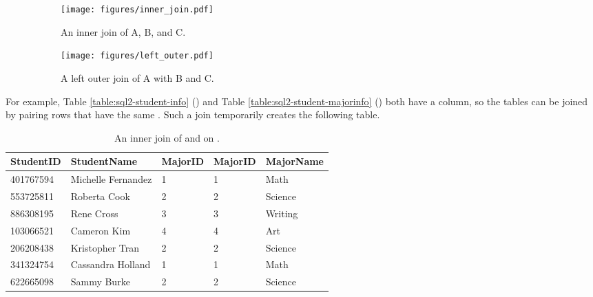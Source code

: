 \begin{figure}[H] %
\captionsetup[subfigure]{justification=centering}
\centering
\begin{subfigure}{.4\textwidth}
    \centering
    \texttt{[image: figures/inner\_join.pdf]}
    \caption{An inner join of A, B, and C.}
    \label{fig:sql2-inner-join}
\end{subfigure}
\hfil
\begin{subfigure}{.4\textwidth}
    \centering
    \texttt{[image: figures/left\_outer.pdf]}
    \caption{A left outer join of A with B and C.}
    \label{fig:sql2-left-join}
\end{subfigure}
%
\caption{}
\label{fig:joins}
\end{figure}

For example, Table \ref{table:sql2-student-info} () and Table \ref{table:sql2-student-majorinfo} () both have a  column, so the tables can be joined by pairing rows that have the same .
Such a join temporarily creates the following table.

\begin{table}[H]
\centering
\footnotesize
\begin{tabular}{|l|l|l|l|l|}
    \hline StudentID & StudentName & MajorID & MajorID & MajorName \\ \hline
    401767594 & Michelle Fernandez & 1 & 1 & Math \\
    553725811 & Roberta Cook & 2 & 2 & Science \\
    886308195 & Rene Cross & 3 & 3 & Writing \\
    103066521 & Cameron Kim & 4 & 4 & Art \\
    206208438 & Kristopher Tran & 2 & 2 & Science \\
    341324754 & Cassandra Holland & 1 & 1 & Math \\
    622665098 & Sammy Burke & 2 & 2 & Science \\ \hline
\end{tabular}
\caption{An inner join of  and  on .}
\label{table:sql2-inner-join-temp}
\end{table}


